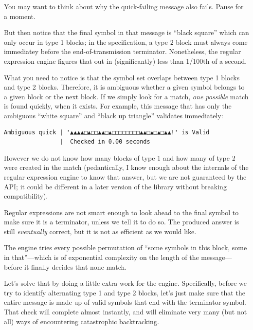 You may want to think about why the quick-failing message also fails.
Pause for a moment.

But then notice that the final symbol in that message is ``black
square'' which can only occur in type 1 blocks; in the specification, a
type 2 block must always come immediatey before the end-of-transmission
terminator. Nonetheless, the regular expression engine figures that out
in (significantly) less than 1/100th of a second.

What you need to notice is that the symbol set overlaps between type 1
blocks and type 2 blocks. Therefore, it is ambiguous whether a given
symbol belongs to a given block or the next block. If we simply look for
a match, \emph{one possible} match is found quickly, when it exists. For
example, this message that has only the ambiguous ``white square'' and
``black up triangle'' validates immediately:

\begin{verbatim}
Ambiguous quick | '▲▲▲▲□▲□□▲▲□▲□□□□□□□□▲▲□▲□▲□▲▲!' is Valid
                |  Checked in 0.00 seconds
\end{verbatim}

However we do not know how many blocks of type 1 and how many of type 2
were created in the match (pedantically, I know enough about the
internals of the regular expression engine to know that answer, but we
are not guaranteed by the API; it could be different in a later version
of the library without breaking compatibility).

Regular expressions are not smart enough to look ahead to the final
symbol to make sure it is a terminator, unless we tell it to do so. The
produced answer is still \emph{eventually} correct, but it is not as
efficient as we would like.

The engine tries every possible permutation of ``some symbols in this
block, some in that''---which is of exponential complexity on the length
of the message---before it finally decides that none match.

Let's solve that by doing a little extra work for the engine.
Specifically, before we try to identify alternating type 1 and type 2
blocks, let's just make sure that the entire message is made up of valid
symbols that end with the terminator symbol. That check will complete
almost instantly, and will eliminate very many (but not all) ways of
encountering catastrophic backtracking.

